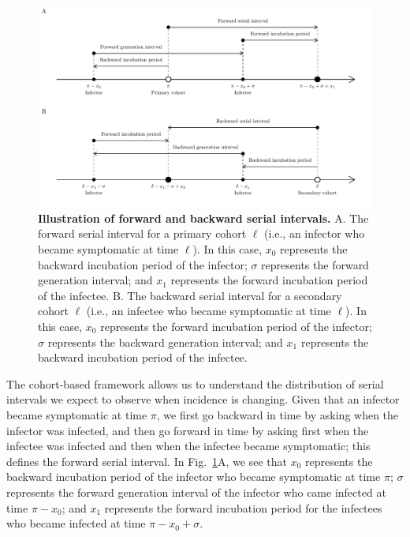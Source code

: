 \documentclass[12pt]{article}
\newcommand{\fref}[1]{Fig.~\ref{fig:#1}}
\begin{document}
\begin{figure}[!th]
\includegraphics[width=\textwidth]{serial_guide.pdf}
\caption{
\textbf{Illustration of forward and backward serial intervals.}
A. The forward serial interval for a primary cohort $\ell$ (i.e., an infector who became symptomatic at time $\ell$).
In this case, $x_0$ represents the backward incubation period of the infector;
$\sigma$ represents the forward generation interval;
and $x_1$ represents the forward incubation period of the infectee.
B. The backward serial interval for a secondary cohort $\ell$ (i.e., an infectee who became symptomatic at time $\ell$).
In this case, $x_0$ represents the forward incubation period of the infector;
$\sigma$ represents the backward generation interval;
and $x_1$ represents the backward incubation period of the infectee.
}
\label{fig:diagram}
\end{figure}

The cohort-based framework allows us to understand the distribution of serial intervals we expect to observe when incidence is changing.
Given that an infector became symptomatic at time $\pi$, we first go backward in time by asking when the infector was infected, and then go forward in time by asking first when the infectee was infected and then when the infectee became symptomatic;
this defines the forward serial interval.
In \fref{diagram}A, we see that $x_0$ represents the backward incubation period of the infector who became symptomatic at time $\pi$;
$\sigma$ represents the forward generation interval of the infector who came infected at time $\pi - x_0$;
and $x_1$ represents the forward incubation period for the infectees who became infected at time $\pi - x_0 + \sigma$.
\end{document}

